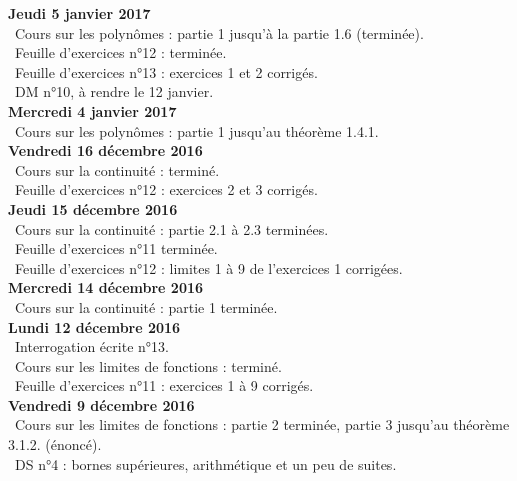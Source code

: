 \documentclass[12pt,a4paper]{article}
\begin{document}
\noindent\textbf{Jeudi 5 janvier 2017}\\
\bu\ Cours sur les polynômes : partie  1 jusqu'à la partie 1.6 (terminée).\\
\bu\ Feuille d'exercices n°12 : terminée.\\
\bu\ Feuille d'exercices n°13 : exercices 1 et 2 corrigés.\\
\bu\ DM n°10, à rendre le 12 janvier.\vspace{.4cm}\\

\noindent\textbf{Mercredi 4 janvier 2017}\\
\bu\ Cours sur les polynômes : partie  1 jusqu'au théorème 1.4.1.\vspace{.4cm}\\

\noindent\textbf{Vendredi 16 décembre 2016}\\
\bu\ Cours sur la continuité : terminé.\\
\bu\ Feuille d'exercices n°12 : exercices 2 et 3 corrigés.\vspace{.4cm}\\

\noindent\textbf{Jeudi 15 décembre 2016}\\
\bu\ Cours sur la continuité : partie 2.1 à 2.3 terminées.\\
\bu\ Feuille d'exercices n°11 terminée.\\
\bu\ Feuille d'exercices n°12 : limites 1 à 9 de l'exercices 1 corrigées.\vspace{.4cm}\\

\noindent\textbf{Mercredi 14 décembre 2016}\\
\bu\ Cours sur la continuité : partie 1 terminée. \vspace{.4cm}\\

\noindent\textbf{Lundi 12 décembre 2016}\\
\bu\ Interrogation écrite n°13.\\
\bu\ Cours sur les limites de fonctions : terminé.\\
\bu\ Feuille d'exercices n°11 : exercices 1 à 9 corrigés. \vspace{.4cm}\\

\noindent\textbf{Vendredi 9 décembre 2016}\\
\bu\ Cours sur les limites de fonctions : partie 2 terminée, partie 3 jusqu'au théorème 3.1.2. (énoncé).\\
\bu\ DS n°4 : bornes supérieures, arithmétique et un peu de suites. \vspace{.4cm}\\
\end{document}
